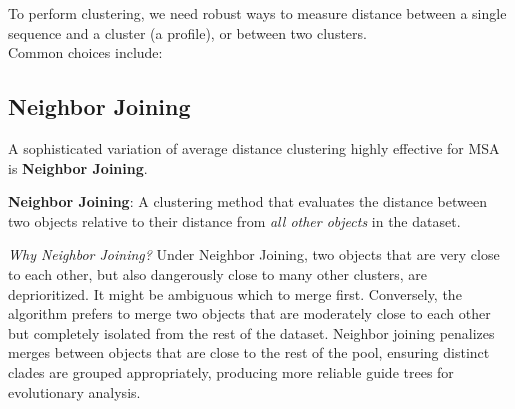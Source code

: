 
To perform clustering, we need robust ways to measure distance between a single sequence and a cluster (a profile), or between two clusters. \\Common choices include:
\vspace{-3em}
\vspace{-1em}
\subsection{Neighbor Joining}
A sophisticated variation of average distance clustering highly effective for MSA is \textbf{Neighbor Joining}.
\begin{important}
\textbf{Neighbor Joining}: A clustering method that evaluates the distance between two objects relative to their distance from \textit{all other objects} in the dataset.
\end{important}
\sta \textit{Why Neighbor Joining?} Under Neighbor Joining, two objects that are very close to each other, but also dangerously close to many other clusters, are deprioritized. It might be ambiguous which to merge first. Conversely, the algorithm prefers to merge two objects that are moderately close to each other but completely isolated from the rest of the dataset. Neighbor joining penalizes merges between objects that are close to the rest of the pool, ensuring distinct clades are grouped appropriately, producing more reliable guide trees for evolutionary analysis.

